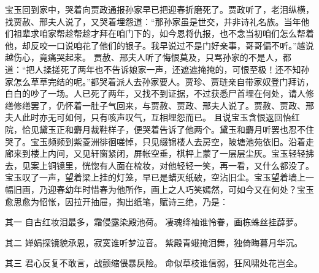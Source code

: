 \documentclass[12pt,oneside]{book}
\begin{document}
宝玉回到家中，哭着向贾政通报孙家早已把迎春折磨死了。贾政听了，老泪纵横，找贾赦、邢夫人说了，又哭着埋怨道：“那孙家虽是世交，并非诗礼名族。当年他们祖辈求咱家帮趁帮趁才拜在咱门下的，如今恩将仇报，也不念当初咱们怎么帮着他，却反咬一口说咱花了他们的银子。我早说过不是门好亲事，哥哥偏不听。”越说越伤心，竟痛哭起来。
贾赦、邢夫人听了悔恨莫及，只骂孙家的不是人，都道：“把人揉搓死了两年也不告诉娘家一声，还遮遮掩掩的，可恨至极！还不知孙家怎么草草完结的呢。”都哭着派人去孙家要人。贾珍、贾琏亲自带家奴登门拜访，白白的吵了一场。人已死了两年，又找不到证据，不过获悉尸首埋在何处，请人修缮修缮罢了，仍怀着一肚子气回来，与贾赦、贾政、邢夫人说了。贾赦、贾政、邢夫人此时亦无可如何，只有咳声叹气，互相埋怨而已。
且说宝玉含恨返回怡红院，恰见黛玉正和麝月裁鞋样子，便哭着告诉了他两个。黛玉和麝月听罢也忍不住哭了。宝玉频频到紫菱洲徘徊嗟悼，只见缀锦楼人去房空，陂塘池苑依旧。沿着走廊来到楼上内间，又见轩窗紧闭，屏帐空垂，棋枰上蒙了一层层尘灰。宝玉轻轻拂去，见案上铜镜里，恍惚有人面在梳妆，对他轻轻一笑，再一看，又什么都没了。宝玉叹了一声，望着梁上挂的灯笼，早已是蜡灭纸破，空沾旧尘。宝玉望着墙上一幅旧画，乃迎春幼年时惜春为他所作，画上之人巧笑嫣然，可如今又在何处？宝玉愈思愈为怊怅，因拉开抽屉，掏出纸笔，赋诗三绝，乃是：

其一
自古红妆泪最多，霜侵露染殿池荷。
凄魂绛袖谁怜眷，画栋蛛丝挂薜萝。

其二
婵娟探镜貌承恩，寂寞谁听梦泣音。
紫殿青蛾掩泪舞，独倚晦暮月华沉。

其三
君心反复不敢言，战颤缩偎暴戾险。
命似草枝谁信弱，狂风啸处花岂全。
\end{document}

